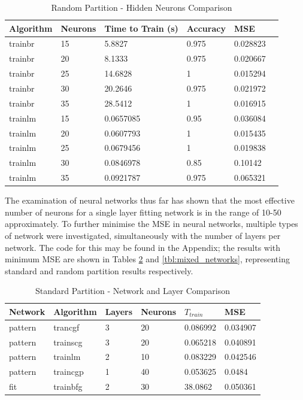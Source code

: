 \documentclass[a4paper, 10pt, conference]{ieeeconf}
\begin{document}
\begin{table}
\centering
\caption{Random Partition - Hidden Neurons Comparison}
\label{tbl:mixed}
\begin{tabular}{llllll}
\hline
\textbf{Algorithm} & \textbf{Neurons} & \textbf{Time to Train (s)} & \textbf{Accuracy} & \textbf{MSE} \\ \hline
trainbr & 15 & 5.8827 & 0.975 & 0.028823 \\ \hline 
trainbr & 20 & 8.1333 & 0.975 & 0.020667 \\ \hline 
trainbr & 25 & 14.6828 & 1 & 0.015294 \\ \hline 
trainbr & 30 & 20.2646 & 0.975 & 0.021972 \\ \hline 
trainbr & 35 & 28.5412 & 1 & 0.016915 \\ \hline 

trainlm & 15 & 0.0657085 & 0.95 & 0.036084 \\ \hline 
trainlm & 20 & 0.0607793 & 1 & 0.015435 \\ \hline 
trainlm & 25 & 0.0679456 & 1 & 0.019838 \\ \hline 
trainlm & 30 & 0.0846978 & 0.85 & 0.10142 \\ \hline 
trainlm & 35 & 0.0921787 & 0.975 & 0.065321 \\ \hline 
\end{tabular}
\end{table}


The examination of neural networks thus far has shown that the most effective number of neurons for a single layer fitting network is in the range of 10-50 approximately. To further minimise the MSE in neural networks, multiple types of network were investigated, simultaneously with the number of layers per network. The code for this may be found in the Appendix; the results with minimum MSE are shown in Tables \ref{tbl:unmixed_networks} and \ref{tbl:mixed_networks}, representing standard and random partition results respectively.

\begin{table}
\centering
\caption{Standard Partition - Network and Layer Comparison}
\label{tbl:unmixed_networks}
\begin{tabular}{llllll}
\hline
\textbf{Network} & \textbf{Algorithm} & \textbf{Layers} & \textbf{Neurons} & \textbf{$T_{train}$} & \textbf{MSE} \\ \hline
pattern & trancgf & 3 & 20 & 0.086992 & 0.034907 \\ \hline
pattern & trainscg & 3 & 20 & 0.065218 & 0.040891 \\ \hline
pattern & trainlm & 2 & 10 & 0.083229 & 0.042546 \\ \hline
pattern & traincgp & 1 & 40 & 0.053625 & 0.0484 \\ \hline
fit & trainbfg & 2 & 30 & 38.0862 & 0.050361 \\ \hline
\end{tabular}
\end{table}
\end{document}
